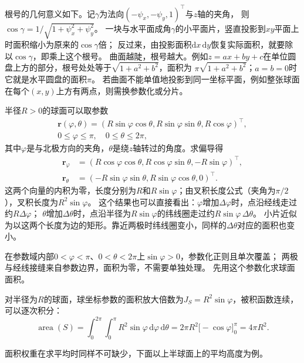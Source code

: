根号的几何意义如下。记$\gamma$为法向$(-\psi_x,-\psi_y,1)^\top$与$z$轴的夹角，
则$\cos\gamma=1/\sqrt{1+\psi_x^2+\psi_y^2}$。
一块与水平面成角$\gamma$的小平面片，竖直投影到$xy$平面上时面积缩小为原来的$\cos\gamma$倍；
反过来，由投影面积$\mathrm dx\,\mathrm dy$恢复实际面积，就要除以$\cos\gamma$，即乘上这个根号。
曲面越陡，根号越大。例如$z=ax+by+c$在单位圆盘上方的部分，根号处处等于$\sqrt{1+a^2+b^2}$，面积为
$\pi\sqrt{1+a^2+b^2}$；$a=b=0$时它就是水平圆盘的面积$\pi$。
若曲面不能单值地投影到同一坐标平面，例如整张球面在每个$(x,y)$上方有两点，则需换参数化或分片。

半径$R>0$的球面可以取参数
\[
 \begin{gathered}
 \bm r(\varphi,\theta)
 =(R\sin\varphi\cos\theta,R\sin\varphi\sin\theta,R\cos\varphi)^\top,\\
 0\leq\varphi\leq\pi,\quad 0\leq\theta\leq2\pi,
 \end{gathered}
\]
其中$\varphi$是与北极方向的夹角，$\theta$是绕$z$轴转过的角度。求偏导得
\[
 \begin{aligned}
 \bm r_\varphi&=(R\cos\varphi\cos\theta,R\cos\varphi\sin\theta,-R\sin\varphi)^\top,\\
 \bm r_\theta&=(-R\sin\varphi\sin\theta,R\sin\varphi\cos\theta,0)^\top.
 \end{aligned}
\]
这两个向量的内积为零，长度分别为$R$和$R\sin\varphi$；由叉积长度公式（夹角为$\pi/2$），叉积长度为$R^2\sin\varphi$。
这个结果也可以直接看出：$\varphi$增加$\Delta\varphi$时，点沿经线走过约$R\Delta\varphi$；
$\theta$增加$\Delta\theta$时，点沿半径为$R\sin\varphi$的纬线圈走过约$R\sin\varphi\,\Delta\theta$。
小片近似为以这两个长度为边的矩形。靠近两极时纬线圈变小，同样的$\Delta\theta$对应的面积也变小。

在参数域内部$0<\varphi<\pi$、$0<\theta<2\pi$上$\sin\varphi>0$，参数化正则且单次覆盖；
两极与经线接缝来自参数边界，面积为零，不需要单独处理。
先用这个参数化求球面面积。

\begin{example}[球面的面积]
\label{ex:analysis-sphere-area}
对半径为$R$的球面，球坐标参数的面积放大倍数为$J_S=R^2\sin\varphi$，被积函数连续，可以逐次积分：
\[
 \operatorname{area}(S)
 =\int_0^{2\pi}\int_0^\pi R^2\sin\varphi\,\mathrm d\varphi\,\mathrm d\theta
 =2\pi R^2\bigl[-\cos\varphi\bigr]_0^\pi
 =4\pi R^2.
\]
\end{example}





面积权重在求平均时同样不可缺少，下面以上半球面上的平均高度为例。

